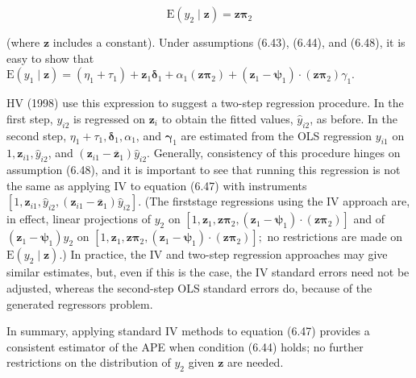 \documentclass[10pt]{article}
\begin{document}
\begin{equation*}
\mathrm{E}\left(y_{2} \mid \mathbf{z}\right)=\mathbf{z} \boldsymbol{\pi}_{2} \tag{6.48}
\end{equation*}


(where $\mathbf{z}$ includes a constant). Under assumptions (6.43), (6.44), and (6.48), it is easy to show that\\
$\mathrm{E}\left(y_{1} \mid \mathbf{z}\right)=\left(\eta_{1}+\tau_{1}\right)+\mathbf{z}_{1} \boldsymbol{\delta}_{1}+\alpha_{1}\left(\mathbf{z} \boldsymbol{\pi}_{2}\right)+\left(\mathbf{z}_{1}-\boldsymbol{\psi}_{1}\right) \cdot\left(\mathbf{z} \boldsymbol{\pi}_{2}\right) \gamma_{1}$.

HV (1998) use this expression to suggest a two-step regression procedure. In the first step, $y_{i 2}$ is regressed on $\mathbf{z}_{i}$ to obtain the fitted values, $\hat{y}_{i 2}$, as before. In the second step, $\eta_{1}+\tau_{1}, \boldsymbol{\delta}_{1}, \alpha_{1}$, and $\boldsymbol{\gamma}_{1}$ are estimated from the OLS regression $y_{i 1}$ on $1, \mathbf{z}_{i 1}, \hat{y}_{i 2}$, and $\left(\mathbf{z}_{i 1}-\overline{\mathbf{z}}_{1}\right) \hat{y}_{i 2}$. Generally, consistency of this procedure hinges on assumption (6.48), and it is important to see that running this regression is not the same as applying IV to equation (6.47) with instruments $\left[1, \mathbf{z}_{i 1}, \hat{y}_{i 2},\left(\mathbf{z}_{i 1}-\overline{\mathbf{z}}_{1}\right) \hat{y}_{i 2}\right]$. (The firststage regressions using the IV approach are, in effect, linear projections of $y_{2}$ on $\left[1, \mathbf{z}_{1}, \mathbf{z} \boldsymbol{\pi}_{2},\left(\mathbf{z}_{1}-\boldsymbol{\psi}_{1}\right) \cdot\left(\mathbf{z} \boldsymbol{\pi}_{2}\right)\right]$ and of $\left(\mathbf{z}_{1}-\boldsymbol{\psi}_{1}\right) y_{2}$ on $\left[1, \mathbf{z}_{1}, \mathbf{z} \boldsymbol{\pi}_{2},\left(\mathbf{z}_{1}-\boldsymbol{\psi}_{1}\right) \cdot\left(\mathbf{z} \boldsymbol{\pi}_{2}\right)\right] ;$ no restrictions are made on $\mathrm{E}\left(y_{2} \mid \mathbf{z}\right)$.) In practice, the IV and two-step regression approaches may give similar estimates, but, even if this is the case, the IV standard errors need not be adjusted, whereas the second-step OLS standard errors do, because of the generated regressors problem.

In summary, applying standard IV methods to equation (6.47) provides a consistent estimator of the APE when condition (6.44) holds; no further restrictions on the distribution of $y_{2}$ given $\mathbf{z}$ are needed.
\end{document}
